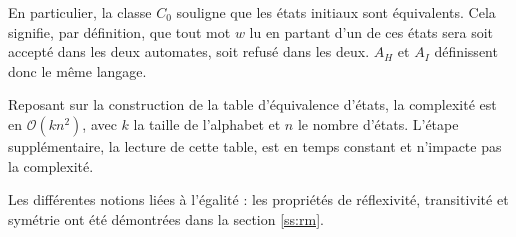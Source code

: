 En particulier, la classe $C_0$ souligne que les états initiaux sont équivalents. Cela signifie, par définition, que tout mot $w$ lu en partant d'un de ces états sera soit accepté dans les deux automates, soit refusé dans les deux. $A_H$ et $A_I$ définissent donc le même langage.
\begin{complexity}
 Reposant sur la construction de la table d'équivalence d'états, la complexité est en $\mathcal{O}(kn^2)$, avec $k$ la taille de l'alphabet et $n$ le nombre d'états. L'étape supplémentaire, la lecture de cette table, est en temps constant et n'impacte pas la complexité.
\end{complexity}


Les différentes notions liées à l'égalité : les propriétés de réflexivité, transitivité et symétrie ont été démontrées dans la section \ref{ss:rm}.
